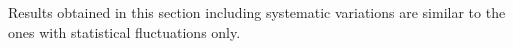 Results obtained in this section including systematic variations are similar to the ones with statistical fluctuations only. 

